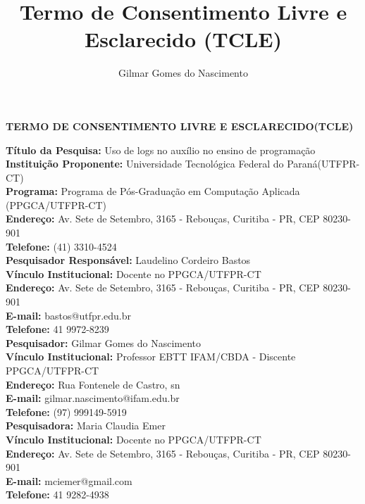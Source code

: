 \documentclass[12pt,a4paper]{article}
\author{Gilmar Gomes do Nascimento}
\title{Termo de Consentimento Livre e Esclarecido (TCLE)}
\begin{document}
\begin{center}
\textbf{TERMO DE CONSENTIMENTO LIVRE E ESCLARECIDO(TCLE)}
\end{center}

\vspace{2\baselineskip} %
\noindent
\textbf{Título da Pesquisa:} Uso de logs no auxílio no ensino de programação \\
\textbf{Instituição Proponente:} Universidade Tecnológica Federal do Paraná(UTFPR-CT)\\
\textbf{Programa:} Programa de Pós-Graduação em Computação Aplicada (PPGCA/UTFPR-CT)\\
\textbf{Endereço:} Av. Sete de Setembro, 3165 - Rebouças, Curitiba - PR, CEP 80230-901 \\
\textbf{Telefone:} (41) 3310-4524 \\

\vspace{\baselineskip}
\noindent \textbf{Pesquisador Responsável:} Laudelino Cordeiro Bastos\\
\textbf{Vínculo Institucional:} Docente no PPGCA/UTFPR-CT \\
\textbf{Endereço:} Av. Sete de Setembro, 3165 - Rebouças, Curitiba - PR, CEP 80230-901 \\
\textbf{E-mail:} bastos@utfpr.edu.br \\
\textbf{Telefone:} 41 9972-8239 \\

\vspace{\baselineskip}
\noindent\textbf{Pesquisador:} Gilmar Gomes do Nascimento \\
\textbf{Vínculo Institucional:} Professor EBTT IFAM/CBDA - Discente PPGCA/UTFPR-CT \\
\textbf{Endereço:} Rua Fontenele de Castro, sn \\
\textbf{E-mail:} gilmar.nascimento@ifam.edu.br \\
\textbf{Telefone:} (97) 999149-5919 \\

\vspace{\baselineskip}
\noindent
\textbf{Pesquisadora:} Maria Claudia Emer \\
\textbf{Vínculo Institucional:} Docente no PPGCA/UTFPR-CT\\
\textbf{Endereço:} Av. Sete de Setembro, 3165 - Rebouças, Curitiba - PR, CEP 80230-901 \\
\textbf{E-mail:} mciemer@gmail.com \\
\textbf{Telefone:} 41 9282-4938
\vspace{\baselineskip}
\end{document}
